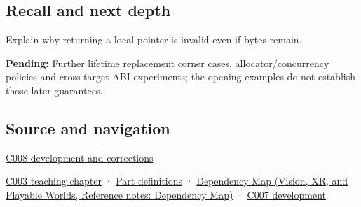 \subsection{Recall and next depth}\label{appendix-0b104bcba06b-recall-and-next-depth}

\hypertarget{appendix-0b104bcba06b-recall-and-next-depth}{}

Explain why returning a local pointer is invalid even if bytes remain.

\textbf{Pending:} Further lifetime replacement corner cases, allocator/concurrency policies and cross-target ABI experiments; the opening examples do not establish those later guarantees.

\subsection{Source and navigation}\label{appendix-0b104bcba06b-source-and-navigation}

\hypertarget{appendix-0b104bcba06b-source-and-navigation}{}

\hyperref[appendix-fd090d982a15-m008---parts-113-126]{C008 development and corrections}

\hyperref[01-foundations-i-ch002-where-the-bytes-live]{C003 teaching chapter} · \hyperref[appendix-fd090d982a15-m003---parts-41-60]{Part definitions} · \href{../07-Vision-XR-and-Playable-Worlds/main.pdf\#nameddest=appendix-4ad47bdd269a}{Dependency Map (Vision, XR, and Playable Worlds, Reference notes: Dependency Map)} · \hyperref[01-foundations-i-ch002-storage-is-a-place-an-object-is-its-occupant]{C007 development}
